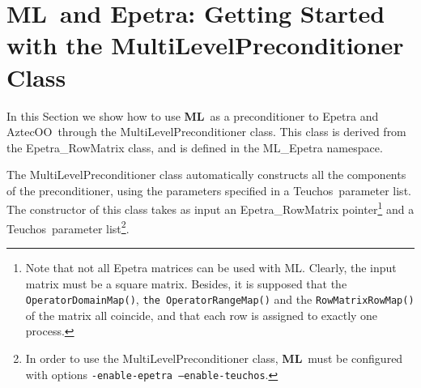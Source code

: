 \documentclass{article}[11pt]
\newcommand{\Aztecoo}  {{\sc AztecOO}}
\newcommand{\aztecoo}  {{\Aztecoo}}
\newcommand{\ML}     {{\bf ML}}
\newcommand{\trilinos}  {{\sc Trilinos}}
\newcommand{\teuchos}  {{\sc Teuchos}}
\begin{document}

\newpage

\section{\ML\ and Epetra: Getting Started with the MultiLevelPreconditioner
Class}\label{sec:getting_started}

In this Section we show how to use \ML\ as a preconditioner to {\sc
  Epetra} and \aztecoo~through the MultiLevelPreconditioner
class. This class is derived from the
  Epetra\_RowMatrix class, and is defined in the ML\_Epetra namespace.

The MultiLevelPreconditioner class automatically constructs all the
components of the preconditioner, using the parameters specified in a
\teuchos~parameter list.
The constructor of this class takes as input an Epetra\_RowMatrix
pointer\footnote{Note that not all Epetra matrices can be used with ML. Clearly,
the input matrix must be a square matrix. Besides,
it is supposed that the {\tt OperatorDomainMap()}, {\tt the OperatorRangeMap()} and
the {\tt RowMatrixRowMap()} of the matrix all coincide, and that each row is assigned
to exactly one process.} and a \teuchos~parameter list\footnote{In order to use the
  MultiLevelPreconditioner class, \ML\ must be configured with options
  {\tt -enable-epetra --enable-teuchos}.}.

\end{document}

